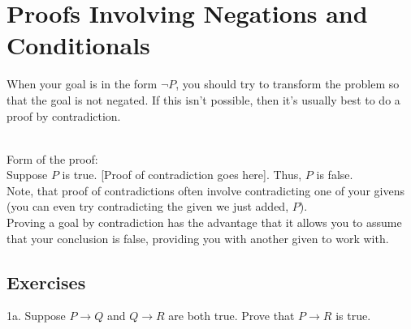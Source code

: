 \documentclass{article}
\begin{document}
\section{Proofs Involving Negations and Conditionals}
When your goal is in the form $\neg P$, you should try to transform the problem so that the goal is not negated. If this isn't possible, then it's usually best to do a proof by contradiction.\\
 \\
Form of the proof:\\
Suppose $P$ is true. [Proof of contradiction goes here]. Thus, $P$ is false.\\

\noindent Note, that proof of contradictions often involve contradicting one of your givens (you can even try contradicting the given we just added, $P$).\\

\noindent Proving a goal by contradiction has the advantage that it allows you to assume that your conclusion is false, providing you with another given to work with.

\subsection{Exercises}
1a. Suppose $P \rightarrow Q$ and $Q \rightarrow R$ are both true. Prove that $P \rightarrow R$ is true.\\
\end{document}
